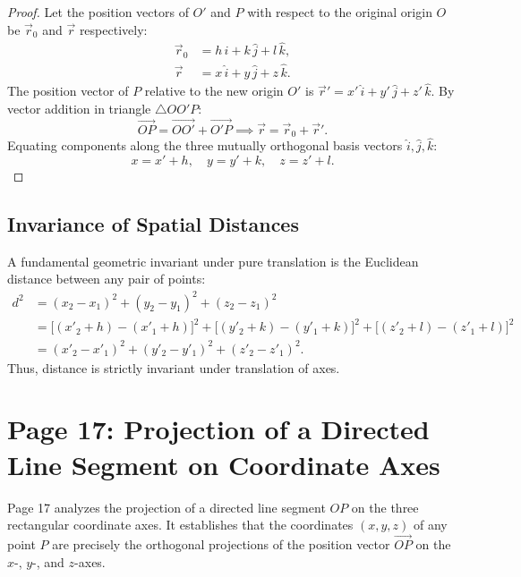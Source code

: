 \begin{proof}
Let the position vectors of $O'$ and $P$ with respect to the original origin $O$ be $\vec{r}_0$ and $\vec{r}$ respectively:
\begin{align}
    \vec{r}_0 &= h\,\hat{i} + k\,\hat{j} + l\,\hat{k}, \\
    \vec{r} &= x\,\hat{i} + y\,\hat{j} + z\,\hat{k}.
\end{align}
The position vector of $P$ relative to the new origin $O'$ is $\vec{r}' = x'\,\hat{i} + y'\,\hat{j} + z'\,\hat{k}$.
By vector addition in triangle $\triangle OO'P$:
\begin{equation}
    \vec{OP} = \vec{OO'} + \vec{O'P} \implies \vec{r} = \vec{r}_0 + \vec{r}'.
\end{equation}
Equating components along the three mutually orthogonal basis vectors $\hat{i}, \hat{j}, \hat{k}$:
\begin{equation}
    x = x' + h, \quad y = y' + k, \quad z = z' + l.
\end{equation}
\end{proof}

\subsection{Invariance of Spatial Distances}
A fundamental geometric invariant under pure translation is the Euclidean distance between any pair of points:
\begin{align}
    d^2 &= (x_2 - x_1)^2 + (y_2 - y_1)^2 + (z_2 - z_1)^2 \nonumber\\
    &= \bigl[(x'_2 + h) - (x'_1 + h)\bigr]^2 + \bigl[(y'_2 + k) - (y'_1 + k)\bigr]^2 + \bigl[(z'_2 + l) - (z'_1 + l)\bigr]^2 \nonumber\\
    &= (x'_2 - x'_1)^2 + (y'_2 - y'_1)^2 + (z'_2 - z'_1)^2.
\end{align}
Thus, distance is strictly invariant under translation of axes.

\section{Page 17: Projection of a Directed Line Segment on Coordinate Axes}
\label{sec:page17}

\begin{conceptbox}
Page 17 analyzes the projection of a directed line segment $OP$ on the three rectangular coordinate axes. It establishes that the coordinates $(x,y,z)$ of any point $P$ are precisely the orthogonal projections of the position vector $\vec{OP}$ on the $x$-, $y$-, and $z$-axes.
\end{conceptbox}

